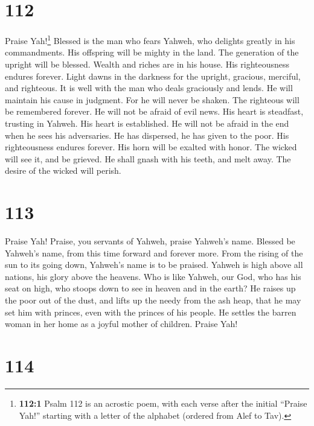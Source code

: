 \hypertarget{section-111}{%
\section{112}\label{section-111}}

 Praise Yah!\footnote{\textbf{112:1} Psalm 112 is an
  acrostic poem, with each verse after the initial ``Praise Yah!''
  starting with a letter of the alphabet (ordered from Alef to Tav).}
Blessed is the man who fears Yahweh, who delights greatly in his
commandments.  His offspring will be mighty in the land.
The generation of the upright will be blessed.  Wealth and
riches are in his house. His righteousness endures forever.
 Light dawns in the darkness for the upright, gracious,
merciful, and righteous.  It is well with the man who
deals graciously and lends. He will maintain his cause in judgment.
 For he will never be shaken. The righteous will be
remembered forever.  He will not be afraid of evil news.
His heart is steadfast, trusting in Yahweh.  His heart is
established. He will not be afraid in the end when he sees his
adversaries.  He has dispersed, he has given to the poor.
His righteousness endures forever. His horn will be exalted with honor.
 The wicked will see it, and be grieved. He shall gnash
with his teeth, and melt away. The desire of the wicked will perish.

\hypertarget{section-112}{%
\section{113}\label{section-112}}

 Praise Yah! Praise, you servants of Yahweh, praise
Yahweh's name.  Blessed be Yahweh's name, from this time
forward and forever more.  From the rising of the sun to
its going down, Yahweh's name is to be praised.  Yahweh is
high above all nations, his glory above the heavens.  Who
is like Yahweh, our God, who has his seat on high,  who
stoops down to see in heaven and in the earth?  He raises
up the poor out of the dust, and lifts up the needy from the ash heap,
 that he may set him with princes, even with the princes
of his people.  He settles the barren woman in her home as
a joyful mother of children. Praise Yah!

\hypertarget{section-113}{%
\section{114}\label{section-113}}

